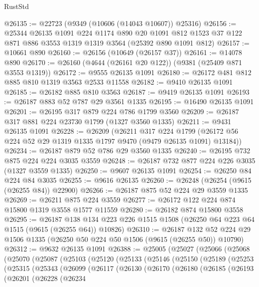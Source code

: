 \begin{lexlean}{RustStd}
\begin{coremodule}
@26135 := @22723 (@9349 (@10606 (@14043 @10607)) @25316)
@26156 := @25344
    @26135
    @1091
    @224
    @1174
    @890
    @20
    @1091
    @812
    @1523
    @37
    @122
    @871
    @886
    @3553
    @1319
    @1319
    @3564
    (@25392 @890 @1091 @812)
@26157 := @10661 @890
@26160 := @26156 (@10649 (@26157 @37))
@26161 := @14078 @890
@26170 := @26160 (@4644 (@26161 @20 @122)) (@9381 (@25409 @871 @3553 @1319))
@26172 := @9555 @26135 @1091
@26180 := @26172 @481 @812 @885 @810 @1319 @3563 @2533 @11558
@26182 := @9410 @26135 @1091
@26185 := @26182 @885 @810 @3563
@26187 := @9419 @26135 @1091
@26193 := @26187 @883 @52 @787 @29 @3561 @1335
@26195 := @16490 @26135 @1091
@26201 := @26195 @317 @879 @224 @786 @1799 @3560
@26209 := @26187 @317 @881 @224 @23730 @1799 (@1327 @3560 @1335)
@26211 := @9431 @26135 @1091
@26228 := @26209
    (@26211
      @317
      @224
      @1799
      (@26172 @56 @224 @52 @29 @1319 @1335 @1797 @9470 (@9479 @26135 @1091) @13184))
@26234 := @26187 @879 @52 @786 @29 @3560 @1335
@26240 := @26195 @732 @875 @224 @224 @3035 @3559
@26248 := @26187 @732 @877 @224 @226 @3035 (@1327 @3559 @1335)
@26250 := @9607 @26135 @1091
@26254 := @26250 @84 @224 @84 @3035
@26255 := @9616 @26135
@26260 := @26248 (@26254 (@9615 (@26255 @84)) @22900)
@26266 := @26187 @875 @52 @224 @29 @3559 @1335
@26269 := @26211 @875 @224 @3559
@26277 := @26172 @122 @224 @874 @15800 @1319 @3558 @1577 @11559
@26280 := @26182 @874 @15800 @3558
@26295 := @26187
    @138
    @134
    @223
    @226
    @1515
    @1508
    (@26250 @64 @223 @64 @1515 (@9615 (@26255 @64)) @10826)
@26310 := @26187
    @132
    @52
    @224
    @29
    @1506
    @1335
    (@26250 @50 @224 @50 @1506 (@9615 (@26255 @50)) @10790)
@26312 := @9632 @26135 @1091
@26388 := @25005
    (@25027
      (@25066
        (@25068
          (@25070
            (@25087
              (@25103
                (@25120
                  (@25133
                    (@25146
                      (@25150
                        (@25189
                          (@25253
                            (@25315
                              (@25343
                                (@26099
                                  (@26117
                                    (@26130
                                      (@26170
                                        (@26180
                                          (@26185
                                            (@26193
                                              (@26201
                                                (@26228
                                                  (@26234

\end{coremodule}
\end{lexlean}
